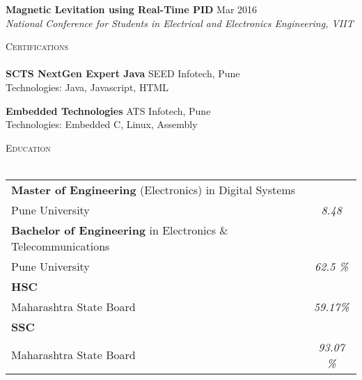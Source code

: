 \documentclass[a4paper]{article}
\newcommand{\lineunder} {
    \vspace*{-8pt} \\
    \hspace*{-18pt} \hrulefill \\
}
\newcommand{\header} [1] {
    {\hspace*{-18pt}\vspace*{6pt} \textsc{#1}}
    \vspace*{-6pt} \lineunder
}
\begin{document}
{\textbf{Magnetic Levitation using Real-Time PID}} \hfill Mar 2016\\
\textit{National Conference for Students in Electrical and Electronics Engineering, VIIT} \\
\vspace*{2mm}

\header{Certifications}
\vspace{1mm}
\textbf{SCTS NextGen Expert Java} \hfill SEED Infotech, Pune\\
Technologies: Java, Javascript, HTML\\
\vspace*{2mm}

\textbf{Embedded Technologies} \hfill ATS Infotech, Pune\\
Technologies: Embedded C, Linux, Assembly\\
\vspace*{2mm}

\header{Education}
\vspace{1mm}
\bgroup
\def\arraystretch{1.2}
\begin{tabularx}{\textwidth}{ | X | c | }
  \hline

\textbf{Master of Engineering} (Electronics) in Digital Systems & \\
Pune University & \textit{8.48} \\
  \hline

\textbf{Bachelor of Engineering} in Electronics \& Telecommunications & \\
Pune University & \textit{62.5 \%} \\
  \hline

\textbf{HSC} &\\
Maharashtra State Board & \textit{59.17\%}  \\
  \hline

  \textbf{SSC} & \\
Maharashtra State Board & \textit{93.07 \%} \\
  \hline

\end{tabularx}
\egroup
\vspace{2mm}
\end{document}
